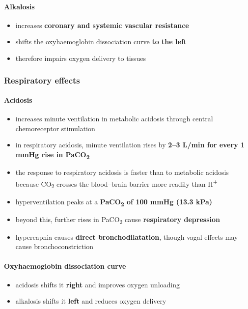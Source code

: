 \documentclass[11pt,a4paper]{article}
\begin{document}
\paragraph{Alkalosis}
\begin{itemize}
  \item increases \textbf{coronary and systemic vascular resistance}
  \item shifts the oxyhaemoglobin dissociation curve \textbf{to the left}
  \item therefore impairs oxygen delivery to tissues
\end{itemize}

\subsubsection{Respiratory effects}

\paragraph{Acidosis}
\begin{itemize}
  \item increases minute ventilation in metabolic acidosis through central chemoreceptor stimulation
  \item in respiratory acidosis, minute ventilation rises by \textbf{2--3 L/min for every 1 mmHg rise in PaCO\textsubscript{2}}
  \item the response to respiratory acidosis is faster than to metabolic acidosis because CO\textsubscript{2} crosses the blood--brain barrier more readily than H\textsuperscript{+}
  \item hyperventilation peaks at a \textbf{PaCO\textsubscript{2} of 100 mmHg (13.3 kPa)}
  \item beyond this, further rises in PaCO\textsubscript{2} cause \textbf{respiratory depression}
  \item hypercapnia causes \textbf{direct bronchodilatation}, though vagal effects may cause bronchoconstriction
\end{itemize}

\paragraph{Oxyhaemoglobin dissociation curve}
\begin{itemize}
  \item acidosis shifts it \textbf{right} and improves oxygen unloading
  \item alkalosis shifts it \textbf{left} and reduces oxygen delivery
\end{itemize}
\end{document}
